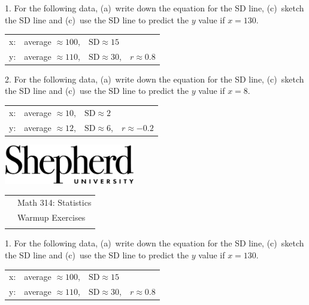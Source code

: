 \documentclass[10pt]{article}
\begin{document}
{\setlength{\baselineskip}{1.05\baselineskip}

1. For the following data, (a)~write down the equation for the SD line, 
(c)~sketch the SD line and (c)~use the SD line to predict the $y$ value
if $x=130$.\vspace{-8pt}
\begin{center}
\begin{tabular}{llll}
x: & average $\approx 100$, & $\mbox{SD}\approx 15$\\
y: & average $\approx 110$, & $\mbox{SD}\approx 30$,  & $r\approx 0.8$\\
\end{tabular}
\end{center}
\vspace{1.25in}

2. For the following data, (a)~write down the equation for the SD line, 
(c)~sketch the SD line and (c)~use the SD line to predict the $y$ value
if $x=8$.\vspace{-8pt}
\begin{center}
\begin{tabular}{llll}
x: & average $\approx 10$, & $\mbox{SD}\approx 2$\\
y: & average $\approx 12$, & $\mbox{SD}\approx 6$,  & $r\approx -0.2$\\
\end{tabular}
\end{center}
\vfill\vfill

\href{http://www.shepherd.edu}{\includegraphics[height=1.75cm]{logo-high-res.eps}}
\vspace{-1.69cm}

{\small
\begin{tabular}{cl}
\hspace{5in} & Math 314:  Statistics\\
                & Warmup Exercises\\
                & %
\end{tabular}
}
\medskip

1. For the following data, (a)~write down the equation for the SD line, 
(c)~sketch the SD line and (c)~use the SD line to predict the $y$ value
if $x=130$.\vspace{-8pt}
\begin{center}
\begin{tabular}{llll}
x: & average $\approx 100$, & $\mbox{SD}\approx 15$\\
y: & average $\approx 110$, & $\mbox{SD}\approx 30$,  & $r\approx 0.8$\\
\end{tabular}
\end{center}
\vspace{1.25in}

}
\end{document}
